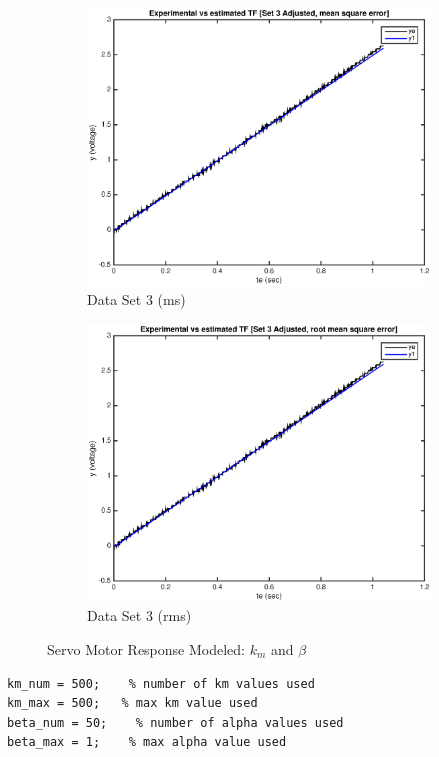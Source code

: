 \documentclass[11pt,a4paper]{article}
\begin{document}
\begin{enumerate}
\begin{figure}[H]
  \begin{subfigure}{0.5\textwidth}
  \includegraphics[width=0.9\linewidth]{Matlab_Figures/y2_dataset3_ms.eps} 
  \caption{Data Set 3 (ms)}
  \label{fig:subim1}
  \end{subfigure}
  \begin{subfigure}{0.5\textwidth}
  \includegraphics[width=0.9\linewidth]{Matlab_Figures/y2_dataset3_rms.eps}
  \caption{Data Set 3 (rms)}
  \label{fig:subim2}
  \end{subfigure}
    \caption{\label{fig:fig_19}Servo Motor Response Modeled: $k_m$ and $\beta$}
    \end{figure}
    
    \pagebreak
 \begin{lstlisting}
km_num = 500;    % number of km values used
km_max = 500;   % max km value used
beta_num = 50;    % number of alpha values used
beta_max = 1;    % max alpha value used


\end{lstlisting}
\end{enumerate}
\end{document}
